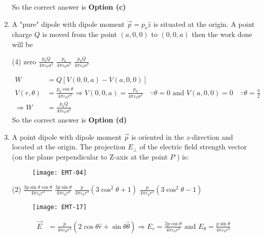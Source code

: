 \begin{enumerate}
\begin{answer}
So the correct answer is \textbf{Option (c)}
\end{answer}
\item  A "pure" dipole with dipole moment $\vec{p}=p_{o} \hat{z}$ is situated at the origin. A point charge $Q$ is moved from the point $(a, 0,0)$ to $(0,0, a)$ then the work done will be
 \begin{tasks}(4)
	\task[\textbf{a.}]zero
	\task[\textbf{b.}] $\frac{p_{0} Q}{4 \pi \varepsilon_{0} a^{3}}$
	\task[\textbf{c.}]$\frac{p_{0}}{4 \pi \varepsilon_{0} a^{2}}$
	\task[\textbf{d.}] $\frac{p_{0} Q}{4 \pi \varepsilon_{0} a^{2}}$
\end{tasks}	
\begin{answer}
	$$
	\begin{aligned}
	W&=Q[V(0,0, a)-V(a, 0,0)]\\
	V(r, \theta)&=\frac{p_{0} \cos \theta}{4 \pi \varepsilon_{0} r^{2}} \Rightarrow V(0,0, a)=\frac{p_{0}}{4 \pi \varepsilon_{0} a^{2}} \quad \because \theta=0 \text { and } V(a, 0,0)=0 \quad \because \theta=\frac{\pi}{2}\\
	\Rightarrow W&=\frac{p_{0} Q}{4 \pi \varepsilon_{0} a^{2}}
\end{aligned}
$$
So the correct answer is \textbf{Option (d)}
\end{answer}
\item A point dipole with dipole moment $\vec{p}$ is oriented in the $z$-direction and located at the origin. The projection $E_{\perp}$ of the electric field strength vector (on the plane perpendicular to $\mathrm{Z}$-axis at the point $P$ ) is:	
\begin{figure}[H]
	\centering
	\texttt{[image: EMT-04]}
\end{figure}	
 \begin{tasks}(2)
	\task[\textbf{a.}]$\frac{3 p \sin \theta \cos \theta}{4 \pi \varepsilon_{0} r^{3}}$
	\task[\textbf{b.}]$\frac{3 p \sin \theta}{4 \pi \varepsilon_{0} r^{3}}$
	\task[\textbf{c.}]$\frac{p}{4 \pi \varepsilon_{0} r^{3}}\left(3 \cos ^{2} \theta+1\right)$
	\task[\textbf{d.}]$\frac{p}{4 \pi \varepsilon_{0} r^{3}}\left(3 \cos ^{2} \theta-1\right)$
\end{tasks}	
\begin{answer}
	\begin{figure}[H]
		\centering
		\texttt{[image: EMT-17]}
	\end{figure}
	$$
	\begin{aligned}
	\vec{E}&=\frac{p}{4 \pi \varepsilon_{0} r^{3}}(2 \cos \theta \hat{r}+\sin \theta \hat{\theta}) \Rightarrow E_{r}=\frac{2 p \cos \theta}{4 \pi \varepsilon_{0} r^{3}} \text { and } E_{\theta}=\frac{p \sin \theta}{4 \pi \varepsilon_{0} r^{3}}\\

\end{aligned}$$
\end{answer}
\end{enumerate}
